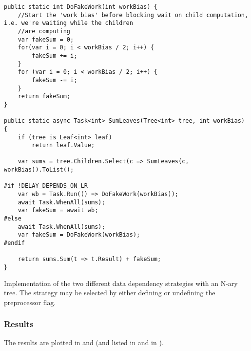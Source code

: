 \begin{listing}
    \begin{verbatim}
public static int DoFakeWork(int workBias) {
    //Start the 'work bias' before blocking wait on child computation, i.e. we're waiting while the children
    //are computing
    var fakeSum = 0;
    for(var i = 0; i < workBias / 2; i++) {
        fakeSum += i;
    }
    for (var i = 0; i < workBias / 2; i++) {
        fakeSum -= i;
    }
    return fakeSum;
}

public static async Task<int> SumLeaves(Tree<int> tree, int workBias)
{
    if (tree is Leaf<int> leaf)
        return leaf.Value;

    var sums = tree.Children.Select(c => SumLeaves(c, workBias)).ToList();
    
#if !DELAY_DEPENDS_ON_LR
    var wb = Task.Run(() => DoFakeWork(workBias));
    await Task.WhenAll(sums);
    var fakeSum = await wb;
#else
    await Task.WhenAll(sums);
    var fakeSum = DoFakeWork(workBias);
#endif
    
    return sums.Sum(t => t.Result) + fakeSum;
}
    \end{verbatim}
    \caption{Implementation of the two different data dependency strategies with an N-ary tree. The strategy may be selected by either defining or undefining the  preprocessor flag.}
    \label{lst:benchmark:strategies}
\end{listing}

\subsubsection{Results}
The results are plotted in  and  (and listed in  and  in ).

\newcommand{\workBiasSymbolics}{\symbolic{Work Bias (iterations),134217728,67108864,33554432,16777216,8388608,4194304,2097152,1048576,524288,262144,131072,65536,32768,16384,8192,4096,2048,1024}}

